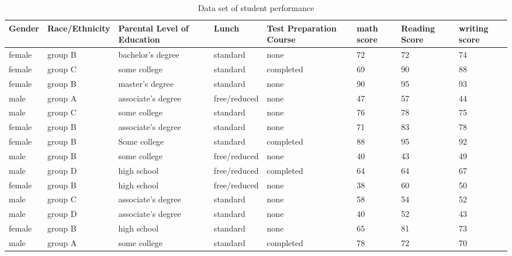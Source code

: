 \documentclass{article}
\begin{document}
	
	\begin{sidewaystable}[h!]
		\begin{center}
			\caption{Data set of student performance}
				\label{tab:table1}
			\begin{tabular}{|l|l|m{2cm}|l|m{2cm}|m{2cm}|m{1.5cm}|m{1.5cm}|}
				\cellcolor{blue!}\textbf{Gender} & \cellcolor{blue!}\textbf{Race/Ethnicity} & \cellcolor{blue!}\textbf{Parental Level of Education} & \cellcolor{blue!}\textbf{Lunch} & \cellcolor{blue!}\textbf{Test Preparation Course} & \cellcolor{blue!}\textbf{math score} & \cellcolor{blue!}\textbf{Reading Score} & \cellcolor{blue!}\textbf{writing score}\\				
			\hline
			female & group B & bachelor's degree & standard  & none & 72 & 72 & 74\\
			\hline
			female & group C & some college      & standard  & completed & 69 & 90 & 88\\
			\hline
			female & group B & master's degree   & standard & none & 90 & 95 & 93\\
			\hline
			male   & group A & associate's degree & free/reduced & none & 47 & 57 & 44\\
			\hline
			male   & group C & some college      & standard & none & 76 & 78 & 75\\
			\hline
		    female & group B & associate's degree & standard & none & 71 & 83 & 78\\
		    \hline
		    female & group B & Some college & standard  & completed & 88 & 95 & 92\\
		    \hline
		    male   & group B & some college & free/reduced & none & 40 & 43 & 49\\
		    \hline
		    male   & group D & high school & free/reduced & completed & 64 & 64 & 67\\
		    \hline
		    female & group B & high school & free/reduced & none & 38 & 60 & 50\\
		    \hline
		    male   & group C & associate's degree & standard & none & 58 & 54 & 52\\
		    \hline
		    male   & group D & associate's degree & standard & none & 40 & 52 & 43\\
		    \hline
		    female & group B & high school & standard & none & 65 & 81 & 73\\
		    \hline
		    male   & group A & some college & standard & completed & 78 & 72 & 70\\
		    \hline 
		\end{tabular}
	\end{center} 
    \end{sidewaystable}
\end{document}
